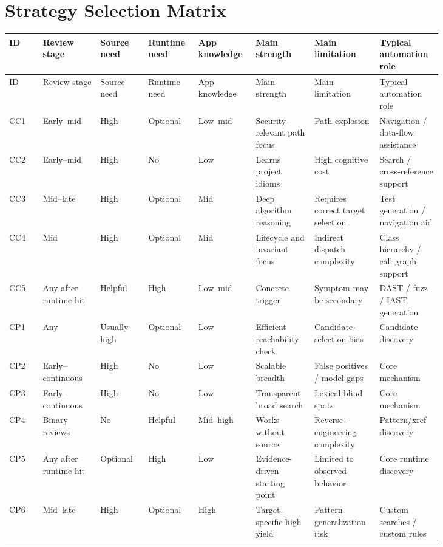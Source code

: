 \documentclass[10pt]{article}
\begin{document}
\section{Strategy Selection Matrix}
\scriptsize
\begin{longtable}{@{}L{0.07\linewidth}L{0.12\linewidth}L{0.10\linewidth}L{0.10\linewidth}L{0.10\linewidth}L{0.11\linewidth}L{0.11\linewidth}L{0.12\linewidth}@{}}
\toprule
ID & Review stage & Source need & Runtime need & App knowledge & Main strength & Main limitation & Typical automation role \\
\midrule
\endfirsthead
\toprule
ID & Review stage & Source need & Runtime need & App knowledge & Main strength & Main limitation & Typical automation role \\
\midrule
\endhead
CC1 & Early--mid & High & Optional & Low--mid & Security-relevant path focus & Path explosion & Navigation / data-flow assistance \\
CC2 & Early--mid & High & No & Low & Learns project idioms & High cognitive cost & Search / cross-reference support \\
CC3 & Mid--late & High & Optional & Mid & Deep algorithm reasoning & Requires correct target selection & Test generation / navigation aid \\
CC4 & Mid & High & Optional & Mid & Lifecycle and invariant focus & Indirect dispatch complexity & Class hierarchy / call graph support \\
CC5 & Any after runtime hit & Helpful & High & Low--mid & Concrete trigger & Symptom may be secondary & DAST / fuzz / IAST generation \\
CP1 & Any & Usually high & Optional & Low & Efficient reachability check & Candidate-selection bias & Candidate discovery \\
CP2 & Early--continuous & High & No & Low & Scalable breadth & False positives / model gaps & Core mechanism \\
CP3 & Early--continuous & High & No & Low & Transparent broad search & Lexical blind spots & Core mechanism \\
CP4 & Binary reviews & No & Helpful & Mid--high & Works without source & Reverse-engineering complexity & Pattern/xref discovery \\
CP5 & Any after runtime hit & Optional & High & Low & Evidence-driven starting point & Limited to observed behavior & Core runtime discovery \\
CP6 & Mid--late & High & Optional & High & Target-specific high yield & Pattern generalization risk & Custom searches / custom rules \\

\end{longtable}
\end{document}
